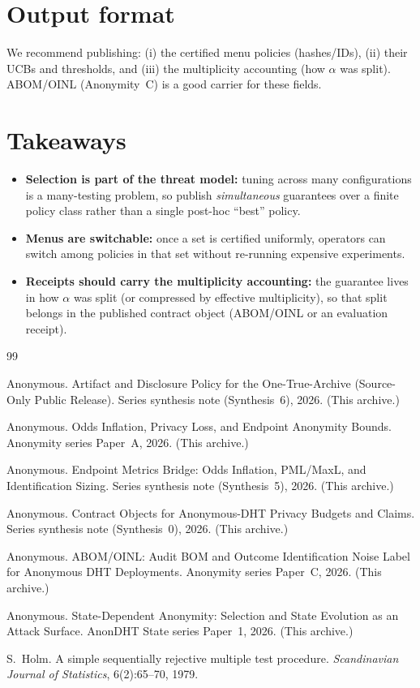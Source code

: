 \documentclass[11pt]{article}
\begin{document}
\section{Output format}
We recommend publishing:
(i) the certified menu policies (hashes/IDs),
(ii) their UCBs and thresholds, and
(iii) the multiplicity accounting (how $\alpha$ was split).
ABOM/OINL (Anonymity~C) is a good carrier for these fields.

\section{Takeaways}
\begin{itemize}[leftmargin=*]
\item \textbf{Selection is part of the threat model:} tuning across many configurations is a many-testing problem, so publish \emph{simultaneous} guarantees over a finite policy class rather than a single post-hoc ``best'' policy.
\item \textbf{Menus are switchable:} once a set is certified uniformly, operators can switch among policies in that set without re-running expensive experiments.
\item \textbf{Receipts should carry the multiplicity accounting:} the guarantee lives in how $\alpha$ was split (or compressed by effective multiplicity), so that split belongs in the published contract object (ABOM/OINL or an evaluation receipt).
\end{itemize}

\begin{thebibliography}{99}\small

Anonymous.
\newblock Artifact and Disclosure Policy for the One-True-Archive (Source-Only Public Release).
\newblock Series synthesis note (Synthesis~6), 2026. (This archive.)

Anonymous.
\newblock Odds Inflation, Privacy Loss, and Endpoint Anonymity Bounds.
\newblock Anonymity series Paper~A, 2026. (This archive.)

Anonymous.
\newblock Endpoint Metrics Bridge: Odds Inflation, PML/MaxL, and Identification Sizing.
\newblock Series synthesis note (Synthesis~5), 2026. (This archive.)

Anonymous.
\newblock Contract Objects for Anonymous-DHT Privacy Budgets and Claims.
\newblock Series synthesis note (Synthesis~0), 2026. (This archive.)

Anonymous.
\newblock ABOM/OINL: Audit BOM and Outcome Identification Noise Label for Anonymous DHT Deployments.
\newblock Anonymity series Paper~C, 2026. (This archive.)

Anonymous.
\newblock State-Dependent Anonymity: Selection and State Evolution as an Attack Surface.
\newblock AnonDHT State series Paper~1, 2026. (This archive.)

S.~Holm.
\newblock A simple sequentially rejective multiple test procedure.
\newblock \emph{Scandinavian Journal of Statistics}, 6(2):65--70, 1979.

\end{thebibliography}
\end{document}
